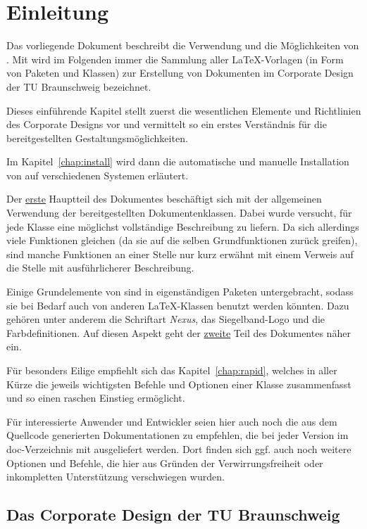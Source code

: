 \chapter{Einleitung}

Das vorliegende Dokument beschreibt die Verwendung und die Möglichkeiten von \tubslatex.
Mit \tubslatex wird im Folgenden immer die Sammlung aller \LaTeX-Vorlagen
(in Form von Paketen und Klassen) zur Erstellung von Dokumenten im
Corporate Design der TU Braunschweig bezeichnet.

Dieses einführende Kapitel stellt zuerst die wesentlichen Elemente und Richtlinien
des Corporate Designs vor und vermittelt so ein erstes Verständnis für
die bereitgestellten Gestaltungsmöglichkeiten.

Im Kapitel~\ref{chap:install} wird dann die automatische und manuelle
Installation von \tubslatex auf verschiedenen Systemen erläutert.

Der \hyperlink{part:user}{erste} Hauptteil des Dokumentes beschäftigt sich mit
der allgemeinen Verwendung der bereitgestellten Dokumentenklassen.
Dabei wurde versucht, für jede Klasse eine möglichst vollständige Beschreibung
zu liefern. Da sich allerdings viele Funktionen gleichen
(da sie auf die selben Grundfunktionen zurück greifen),
sind manche Funktionen an einer Stelle nur kurz erwähnt mit einem Verweis
auf die Stelle mit ausführlicherer Beschreibung.

Einige Grundelemente von \tubslatex sind in eigenständigen Paketen untergebracht,
sodass sie bei Bedarf auch von anderen \LaTeX-Klassen benutzt werden könnten.
Dazu gehören unter anderem die Schriftart \emph{Nexus}, das Siegelband-Logo
und die Farbdefinitionen.
Auf diesen Aspekt geht der \hyperlink{part:packages}{zweite}
Teil des Dokumentes näher ein.

Für besonders Eilige empfiehlt sich das Kapitel~\ref{chap:rapid},
welches in aller Kürze die jeweils wichtigsten Befehle und Optionen einer Klasse
zusammenfasst und so einen raschen Einstieg ermöglicht.

Für interessierte Anwender und Entwickler seien hier auch noch die
aus dem Quellcode generierten Dokumentationen zu empfehlen, die bei jeder
Version im doc-Verzeichnis mit ausgeliefert werden. Dort finden sich
ggf. auch noch weitere Optionen und Befehle, die hier aus Gründen der
Verwirrungsfreiheit oder inkompletten Unterstützung verschwiegen wurden.

\clearpage
\section{Das Corporate Design der TU Braunschweig}\label{sec:intro:dascddertubs}

